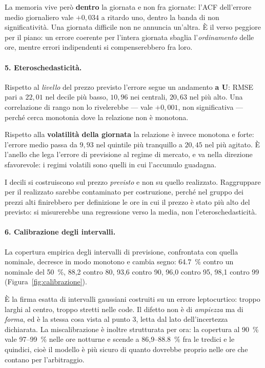 La memoria vive per\`o \textbf{dentro} la giornata e non fra giornate: l'\ac{ACF} dell'errore
medio giornaliero vale $+0{,}034$ a ritardo uno, dentro la banda di non significativit\`a. Una
giornata difficile non ne annuncia un'altra. \`E il verso peggiore per il piano: un errore
coerente per l'intera giornata sbaglia l'\emph{ordinamento} delle ore, mentre errori
indipendenti si compenserebbero fra loro.

\paragraph{5. Eteroschedasticit\`a.} Rispetto al \emph{livello} del prezzo previsto l'errore
segue un andamento \textbf{a U}: \ac{RMSE} pari a $22{,}01$ nel decile pi\`u basso,
$10{,}96$ nei centrali, $20{,}63$ nel pi\`u alto. Una correlazione di rango non lo
rivelerebbe --- vale $+0{,}001$, non significativa --- perch\'e cerca monotonia dove la
relazione non \`e monotona.

Rispetto alla \textbf{volatilit\`a della giornata} la relazione \`e invece monotona e forte:
l'errore medio passa da $9{,}93$ nel quintile pi\`u tranquillo a $20{,}45$ nel pi\`u agitato.
\`E l'anello che lega l'errore di previsione al regime di mercato, e va nella direzione
sfavorevole: i regimi volatili sono quelli in cui l'accumulo guadagna.

I decili si costruiscono sul prezzo \emph{previsto} e non su quello realizzato. Raggruppare
per il realizzato sarebbe contaminato per costruzione, perch\'e nel gruppo dei prezzi alti
finirebbero per definizione le ore in cui il prezzo \`e stato pi\`u alto del previsto: si
misurerebbe una regressione verso la media, non l'eteroschedasticit\`a.

\paragraph{6. Calibrazione degli intervalli.} La copertura empirica degli intervalli di
previsione, confrontata con quella nominale, decresce in modo monotono e cambia segno:
\SI{64,7}{\percent} contro un nominale del \SI{50}{\percent}, 88,2 contro
80, 93,6 contro 90, 96,0 contro 95,
98,1 contro 99 (Figura~\ref{fig:calibrazione}).

\`E la firma esatta di intervalli gaussiani costruiti su un errore leptocurtico: troppo larghi
al centro, troppo stretti nelle code. Il difetto non \`e di \emph{ampiezza} ma di
\emph{forma}, ed \`e la stessa cosa vista al punto 3, letta dal lato dell'incertezza
dichiarata. La miscalibrazione \`e inoltre strutturata per ora: la copertura al
\SI{90}{\percent} vale 97--\SI{99}{\percent} nelle ore notturne e scende a
86,9--\SI{88,8}{\percent} fra le tredici e le quindici, cio\`e il modello \`e pi\`u
sicuro di quanto dovrebbe proprio nelle ore che contano per l'arbitraggio.

